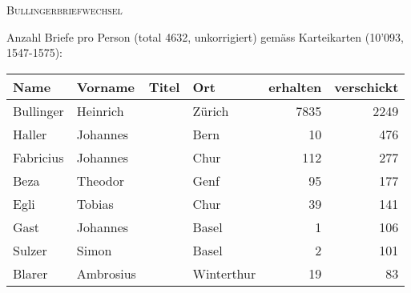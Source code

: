 

\usepackage{caption}
\usepackage{subcaption}




\usepackage{booktabs}
\usepackage{longtable}
\usepackage{tabu}


\sloppy  %

\noindent
{\LARGE \textsc{Bullingerbriefwechsel}}

\vspace{0.3cm}
\noindent
Anzahl Briefe pro Person (total 4632, unkorrigiert) gemäss Karteikarten (10'093, 1547-1575):

\vspace{-0.5cm}
\begin{center}
\begin{tiny}

\setlength\LTleft{0pt}
\setlength\LTright{0pt}
\begin{longtabu}{llllrr}
\toprule
Name & Vorname & Titel & Ort &  erhalten &  verschickt \\
\midrule
                Bullinger &                           Heinrich &             &                                      Zürich &       7835 &      2249 \\
                   Haller &                           Johannes &             &                                        Bern &         10 &       476 \\
                Fabricius &                           Johannes &             &                                        Chur &        112 &       277 \\
                     Beza &                            Theodor &             &                                        Genf &         95 &       177 \\
                     Egli &                             Tobias &             &                                        Chur &         39 &       141 \\
                     Gast &                           Johannes &             &                                       Basel &          1 &       106 \\
                   Sulzer &                              Simon &             &                                       Basel &          2 &       101 \\
                   Blarer &                          Ambrosius &             &                                  Winterthur &         19 &        83 \\

\end{longtabu}
\end{tiny}
\end{center}
